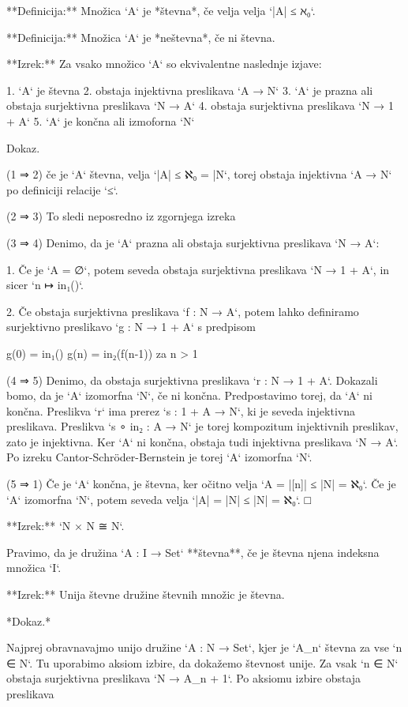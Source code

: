 **Definicija:** Množica `A` je *števna*, če velja velja `|A| ≤ ℵ₀`.

**Definicija:** Množica `A` je *neštevna*, če ni števna.

**Izrek:** Za vsako množico `A` so ekvivalentne naslednje izjave:

1. `A` je števna
2. obstaja injektivna preslikava `A → N`
3. `A` je prazna ali obstaja surjektivna preslikava `N → A`
4. obstaja surjektivna preslikava `N → 1 + A`
5. `A` je končna ali izmoforna `N`

Dokaz.

(1 ⇒ 2) če je `A` števna, velja `|A| ≤ ℵ₀ = |N`, torej obstaja injektivna `A →
N` po definiciji relacije `≤`.

(2 ⇒ 3) To sledi neposredno iz zgornjega izreka

(3 ⇒ 4) Denimo, da je `A` prazna ali obstaja surjektivna preslikava `N → A`:

1. Če je `A = ∅`, potem seveda obstaja surjektivna preslikava `N → 1 + A`, in sicer
`n ↦ in₁()`.

2. Če obstaja surjektivna preslikava `f : N → A`, potem lahko definiramo surjektivno
preslikavo `g : N → 1 + A` s predpisom

        g(0) = in₁()
        g(n) = in₂(f(n-1)) za n > 1

(4 ⇒ 5) Denimo, da obstaja surjektivna preslikava `r : N → 1 + A`. Dokazali
bomo, da je `A` izomorfna `N`, če ni končna. Predpostavimo torej, da `A` ni
končna. Preslikva `r` ima prerez `s : 1 + A → N`, ki je seveda injektivna
preslikava. Preslikva `s ∘ in₂ : A → N` je torej kompozitum injektivnih
preslikav, zato je injektivna. Ker `A` ni končna, obstaja tudi injektivna
preslikava `N → A`. Po izreku Cantor-Schröder-Bernstein je torej `A` izomorfna
`N`.

(5 ⇒ 1) Če je `A` končna, je števna, ker očitno velja `A = |[n]| ≤ |N| = ℵ₀`. Če
je `A` izomorfna `N`, potem seveda velja `|A| = |N| ≤ |N| = ℵ₀`. □


**Izrek:** `N × N ≅ N`.

Pravimo, da je družina `A : I → Set` **števna**, če je števna njena indeksna
množica `I`.

**Izrek:** Unija števne družine števnih množic je števna.

*Dokaz.*

Najprej obravnavajmo unijo družine `A : N → Set`, kjer je `A_n` števna za vse `n ∈ N`.
Tu uporabimo aksiom izbire, da dokažemo števnost unije. Za vsak `n ∈ N` obstaja
surjektivna preslikava `N → A_n + 1`. Po aksiomu izbire obstaja preslikava

